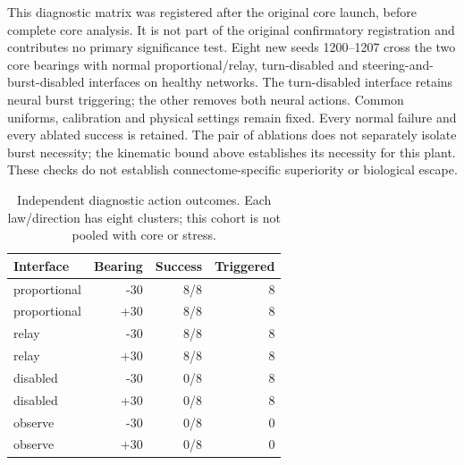 \documentclass[10pt,letterpaper]{article}
\begin{document}
This diagnostic matrix was registered after the original core launch, before complete core analysis. It is not part of the original confirmatory registration and contributes no primary significance test. Eight new seeds 1200--1207 cross the two core bearings with normal proportional/relay, turn-disabled and steering-and-burst-disabled interfaces on healthy networks. The turn-disabled interface retains neural burst triggering; the other removes both neural actions. Common uniforms, calibration and physical settings remain fixed. Every normal failure and every ablated success is retained. The pair of ablations does not separately isolate burst necessity; the kinematic bound above establishes its necessity for this plant. These checks do not establish connectome-specific superiority or biological escape.

\begin{table}[H]
\centering\small
\caption{Independent diagnostic action outcomes. Each law/direction has eight clusters; this cohort is not pooled with core or stress.}
\begin{tabular}{lrrr}
\toprule
Interface & Bearing & Success & Triggered\\
\midrule
proportional & -30 & 8/8 & 8\\
proportional & +30 & 8/8 & 8\\
relay & -30 & 8/8 & 8\\
relay & +30 & 8/8 & 8\\
disabled & -30 & 0/8 & 8\\
disabled & +30 & 0/8 & 8\\
observe & -30 & 0/8 & 0\\
observe & +30 & 0/8 & 0\\
\bottomrule
\end{tabular}
\end{table}
\end{document}
